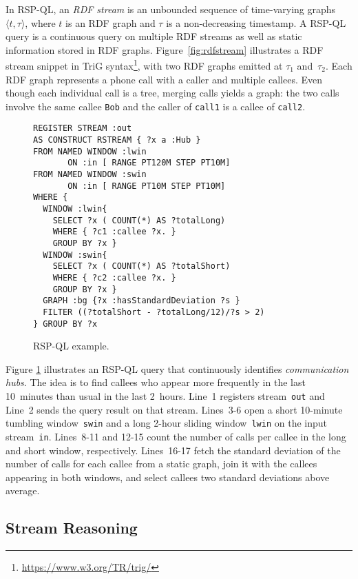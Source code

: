 In RSP-QL, an \textit{RDF stream} is an unbounded sequence of
time-varying graphs $\langle t,\tau\rangle$, where $t$ is an RDF graph
and $\tau$ is a non-decreasing timestamp.  A RSP-QL query is a
continuous query on multiple RDF streams as well as static information
stored in RDF graphs.  Figure~\ref{fig:rdfstream} illustrates a RDF
stream snippet in TriG
syntax\footnote{\url{https://www.w3.org/TR/trig/}}, with two RDF
graphs emitted at $\tau_1$ and~$\tau_2$. Each RDF graph represents a
phone call with a caller and multiple callees. Even though each
individual call is a tree, merging calls yields a graph: the two calls
involve the same callee \lstinline{Bob} and the caller of
\lstinline{call1} is a callee of \lstinline{call2}.

\begin{figure}[!h]
\begin{lstlisting}[language=rsp-ql]
REGISTER STREAM :out
AS CONSTRUCT RSTREAM { ?x a :Hub }
FROM NAMED WINDOW :lwin 
       ON :in [ RANGE PT120M STEP PT10M]
FROM NAMED WINDOW :swin 
       ON :in [ RANGE PT10M STEP PT10M]
WHERE { 
  WINDOW :lwin{
    SELECT ?x ( COUNT(*) AS ?totalLong)
    WHERE { ?c1 :callee ?x. }
    GROUP BY ?x }
  WINDOW :swin{
    SELECT ?x ( COUNT(*) AS ?totalShort)
    WHERE { ?c2 :callee ?x. }
    GROUP BY ?x }
  GRAPH :bg {?x :hasStandardDeviation ?s }
  FILTER ((?totalShort - ?totalLong/12)/?s > 2)
} GROUP BY ?x
\end{lstlisting}
\vspace*{-4mm}
\caption{\label{fig:rspql}RSP-QL example.}
\end{figure}

Figure \ref{fig:rspql} illustrates an RSP-QL query that continuously
identifies \textit{communication hubs}. The idea is to find callees
who appear more frequently in the last 10~minutes than usual in the
last 2~hours. Line~1 registers stream~\lstinline{out} and Line~2 sends
the query result on that stream. \mbox{Lines 3-6} open a short
10-mi\-nute tumbling window~\lstinline{swin} and a long \mbox{2-hour}
sliding window~\lstinline{lwin} on the input
stream~\lstinline{in}. \mbox{Lines 8-11} and \mbox{12-15} count the
number of calls per callee in the long and short window,
respectively. \mbox{Lines 16-17} fetch the standard deviation of the
number of calls for each callee from a static graph, join it with the
callees appearing in both windows, and select callees two
standard deviations above average.

\subsection{Stream Reasoning}\label{sec:sr} %


